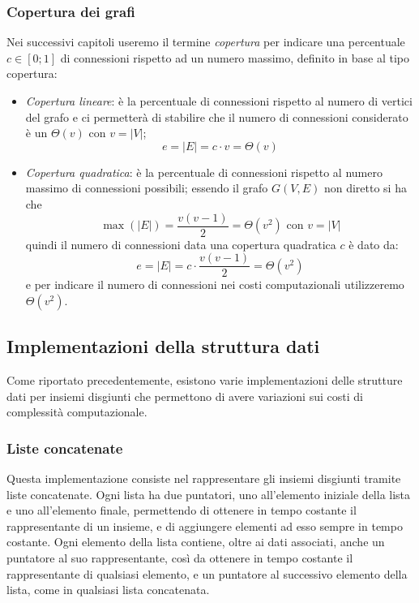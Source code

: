 \subsubsection{Copertura dei grafi}

Nei successivi capitoli useremo il termine \textit{copertura} per indicare una percentuale $c \in [0; 1]$ di connessioni rispetto
ad un numero massimo, definito in base al tipo copertura:

\begin{itemize}
    \item \textit{Copertura lineare}: è la percentuale di connessioni rispetto al numero di vertici del grafo
          e ci permetterà di stabilire che il numero di connessioni considerato è un $\Theta(v)$ con $v = |V|$;
          \begin{equation}
              e = |E| = c \cdot v = \Theta(v) \label{linearCoverage}
          \end{equation}
    \item \textit{Copertura quadratica}: è la percentuale di connessioni rispetto al numero massimo di connessioni
          possibili; essendo il grafo $G(V, E)$ non diretto si ha che
          \begin{equation} \label{maxedges}
              \max(|E|) = \frac{v(v-1)}{2} = \Theta(v^2) \text{ con } v = |V|
          \end{equation}
          quindi il numero di connessioni data una copertura quadratica $c$ è dato da:
          \begin{equation} \label{quadraticCoverage}
              e = |E| = c \cdot \frac{v(v-1)}{2} = \Theta(v^2)
          \end{equation}
          e per indicare il numero di connessioni nei costi computazionali utilizzeremo $\Theta(v^2)$.
\end{itemize}

\subsection{Implementazioni della struttura dati}
Come riportato precedentemente, esistono varie implementazioni delle strutture
dati per insiemi disgiunti che permettono di avere variazioni sui costi di complessità
computazionale.

\subsubsection{Liste concatenate}
Questa implementazione consiste nel rappresentare gli insiemi disgiunti tramite liste
concatenate. Ogni lista ha due puntatori, uno all'elemento iniziale della lista e uno
all'elemento finale, permettendo di ottenere in tempo costante il rappresentante di un
insieme, e di aggiungere elementi ad esso sempre in tempo costante. Ogni elemento della
lista contiene, oltre ai dati associati, anche un puntatore al suo rappresentante, così da
ottenere in tempo costante il rappresentante di qualsiasi elemento, e un puntatore al
successivo elemento della lista, come in qualsiasi lista concatenata.\newline


